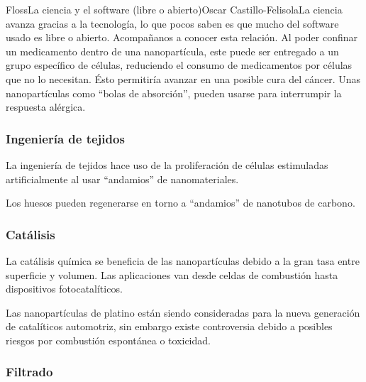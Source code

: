 \begin{article}[2]{Floss}{La ciencia y el software (libre o abierto)}{Oscar Castillo-Felisola}{La ciencia avanza gracias a la tecnolog\'ia, lo que pocos saben es que mucho del software usado es libre o abierto. Acompa\~nanos a conocer esta relaci\'on.}
Al poder confinar un medicamento dentro de una nanopart\'icula, este puede ser entregado a un grupo espec\'ifico de c\'elulas, reduciendo el consumo de medicamentos por c\'elulas que no lo necesitan. \'Esto permitir\'ia avanzar en una posible %
cura del c\'ancer.
Unas nanopart\'iculas como ``bolas de absorci\'on'', pueden usarse para interrumpir la respuesta al\'ergica. 

\subsubsection*{Ingenier\'ia de tejidos}

La ingenier\'ia de tejidos hace uso de la proliferaci\'on de c\'elulas estimuladas artificialmente al usar ``andamios'' de nanomateriales.

Los huesos pueden regenerarse en torno a ``andamios'' de nanotubos de carbono.




\subsubsection*{Cat\'alisis}

La cat\'alisis qu\'imica se beneficia de las nanopart\'iculas debido a la gran tasa entre superficie y volumen. Las aplicaciones van desde celdas de combusti\'on hasta dispositivos fotocatal\'iticos.

Las nanopart\'iculas de platino est\'an siendo consideradas para la nueva generaci\'on de catal\'iticos automotriz, sin embargo existe controversia debido a posibles riesgos por combusti\'on espont\'anea o toxicidad.

\subsubsection*{Filtrado}


\end{article}
